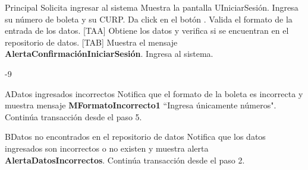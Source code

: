 \begin{UCtrayectoria}{Principal}
  \UCpaso[\UCactor] Solicita ingresar al sistema
  \UCpaso Muestra la pantalla UIniciarSesión.
  \UCpaso[\UCactor] Ingresa su número de boleta y su CURP.
  \UCpaso[\UCactor]Da click en el botón .
  \UCpaso Valida el formato de la entrada de los datos. [TAA]
  \UCpaso Obtiene los datos y verifica si se encuentran en el repositorio de datos. [TAB]
  \UCpaso Muestra el mensaje {\bf AlertaConfirmaciónIniciarSesión}.
  \UCpaso[\UCactor]Ingresa al sistema.
\end{UCtrayectoria}
-9

\begin{UCtrayectoriaA}{A}{Datos ingresados incorrectos}
  \UCpaso Notifica que el formato de la boleta es incorrecta y muestra mensaje {\bf MFormatoIncorrecto1} ``Ingresa únicamente números".
  \UCpaso Continúa transacción desde el paso 5.
\end{UCtrayectoriaA}

\begin{UCtrayectoriaA}{B}{Datos no encontrados en el repositorio de datos}
  \UCpaso Notifica que los datos ingresados son incorrectos o no existen y muestra alerta {\bf AlertaDatosIncorrectos}.
  \UCpaso Continúa transacción desde el paso 2.
\end{UCtrayectoriaA}
